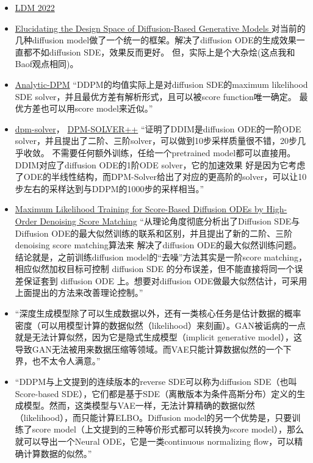 \begin{itemize}
  \item \href{https://arxiv.org/abs/2112.10752}{LDM 2022} 
  
  \item \href{https://arxiv.org/pdf/2206.00364.pdf}{Elucidating the Design Space of Diffusion-Based Generative Models }
  对当前的几种diffusion model做了一个统一的框架。解决了diffusion ODE的生成效果一直都不如diffusion SDE，效果反而更好。
  但，实际上是个大杂烩(这点我和Baof观点相同)。
  \item \href{https://arxiv.org/abs/2201.06503}{Analytic-DPM}
  “DDPM的均值实际上是对diffusion SDE的maximum likelihood SDE solver，并且最优方差有解析形式，且可以被score function唯一确定。
  最优方差也可以用score model来近似。”
  \item \href{https://github.com/LuChengTHU/dpm-solver}{dpm-solver}， 
  \href{https://arxiv.org/pdf/2211.01095.pdf}{DPM-SOLVER++}
  “证明了DDIM是diffusion ODE的一阶ODE solver，并且提出了二阶、三阶solver，可以做到10步采样质量很不错，20步几乎收敛。
  不需要任何额外训练，任给一个pretrained model都可以直接用。 DDIM对应了diffusion ODE的1阶ODE solver，它的加速效果
  好是因为它考虑了ODE的半线性结构，而DPM-Solver给出了对应的更高阶的solver，可以让10步左右的采样达到与DDPM的1000步的采样相当。”
  \item \href{https://arxiv.org/pdf/2206.08265.pdf}{Maximum Likelihood Training for Score-Based Diffusion ODEs by High-Order Denoising Score Matching} 
  “从理论角度彻底分析出了Diffusion SDE与Diffusion ODE的最大似然训练的联系和区别，并且提出了新的二阶、三阶denoising score matching算法来
  解决了diffusion ODE的最大似然训练问题。结论就是，之前训练diffusion model的“去噪”方法其实是一阶score matching，相应似然加权目标可控制 diffusion SDE 的分布误差，但不能直接将同一个误差保证套到 diffusion ODE 上。想要对diffusion ODE做最大似然估计，可采用上面提出的方法来改善理论控制。”
  \item “深度生成模型除了可以生成数据以外，还有一类核心任务是估计数据的概率密度（可以用模型计算的数据似然（likelihood）来刻画）。GAN被诟病的一点就是无法计算似然，因为它是隐式生成模型（implicit generative model），这导致GAN无法被用来数据压缩等领域。而VAE只能计算数据似然的一个下界，也不太令人满意。”
  \item “DDPM与上文提到的连续版本的reverse SDE可以称为diffusion SDE（也叫Score-based SDE），它们都是基于SDE（离散版本为条件高斯分布）定义的生成模型。然而，这类模型与VAE一样，无法计算精确的数据似然（likelihood），而只能计算ELBO。Diffusion model的另一个优势是，只要训练了score model（上文提到的三种等价形式都可以转换为score model），那么就可以导出一个Neural ODE，它是一类continuous normalizing flow，可以精确计算数据的似然。”


\end{itemize}
